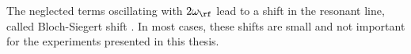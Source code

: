 The neglected terms oscillating with $2\omega_\rf$ lead to a shift in the resonant line, called Bloch-Siegert shift \cite{Bloch:1940wy}. In most cases, these shifts are small and not important for the experiments presented in this thesis.


